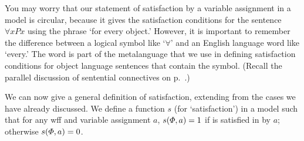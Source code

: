 You may worry that our statement of satisfaction by a variable assignment in a model is circular, because it gives the satisfaction conditions for the sentence $\forall x Px$ using the phrase `for every object.' However, it is important to remember the difference between a logical symbol like `$\forall$' and an English language word like `every.' The word is part of the metalanguage that we use in defining satisfaction conditions for object language sentences that contain the symbol. (Recall the parallel discussion of sentential connectives on p.\ \pageref{truthdefinition}.)

We can now give a general definition of satisfaction, extending from the cases we have already discussed. We define a function $s$ (for `satisfaction') in a model  such that for any wff \metaA{} and variable assignment $a$, $s(\varPhi{}, a)=1$ if \metaA{} is satisfied in  by $a$; otherwise $s(\varPhi{}, a)=0$.

